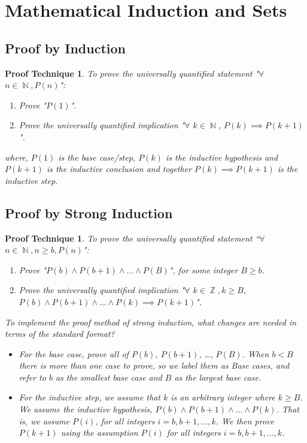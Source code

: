 \documentclass[10pt]{article}
\DeclareMathOperator{\N}{{\mathbb{N}}}
\DeclareMathOperator{\Z}{{\mathbb{Z}}}
\theoremstyle{break}
\newtheorem{pt}[thm]{Proof Technique}
\begin{document}
\newpage

\section{Mathematical Induction and Sets}
\subsection{Proof by Induction}
\begin{pt}
    To prove the universally quantified statement "$\forall$ $n \in \N, P(n)$":
    \begin{enumerate}
        \item Prove "$P(1)$".
        \item Prove the universally quantified implication "$\forall$ $k \in \N$, $P(k) \implies P(k+1)$".
    \end{enumerate}
    where, $P(1)$ is the \emph{base case/step}, $P(k)$ is the \emph{inductive hypothesis} and $P(k+1)$ is the \emph{inductive conclusion} and together $P(k) \implies P(k+1)$ is the \emph{inductive step}. 
\end{pt}
\subsection{Proof by Strong Induction}
\begin{pt}
    To prove the universally quantified statement “$\forall$ $n \in \N, n \ge b, P(n)$":
    \begin{enumerate}
        \item Prove "$P(b) \wedge P(b+1) \wedge \dots \wedge P(B)$", for some integer $B \ge b$.
        \item Prove the universally quantified implication "$\forall$ $k \in \Z, k \ge B$, $P(b) \wedge P(b+1) \wedge \dots \wedge P(k) \implies P(k+1)$".
    \end{enumerate}
    To implement the proof method of strong induction, what changes are needed in terms of the standard format?
    \begin{itemize}
        \item For the base case, prove all of $P(b)$, $P(b+1)$, \dots, $P(B)$. When $b < B$ there is more than one case to prove, so we label them as Base cases, and refer to $b$
        as the smallest base case and $B$ as the largest base case.
        \item For the inductive step, we assume that $k$ is an arbitrary integer where $k \ge B$. We assume the inductive hypothesis, $P(b) \wedge P(b+1) \wedge \dots \wedge P(k)$. That is, we assume $P(i)$, for all integers $i = b, b+1, \dots, k$. We then prove $P(k+1)$ using the assumption
        $P(i)$ for all integers $i = b, b + 1, \dots, k$.
    \end{itemize}
\end{pt}
\end{document}

